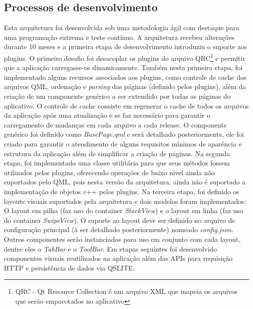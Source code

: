\subsection{Processos de desenvolvimento}
Esta arquitetura foi desenvolvida sob uma metodologia ágil com destaque para uma programação extrema e teste contínuo. A arquitetura recebeu alterações durante 10 meses e a primeira etapa de desenvolvimento introduziu o suporte aos plugins. O primeiro desafio foi desacoplar os plugins do arquivo QRC\footnote{QRC - Qt Resource Collection é um arquivo XML que mapeia os arquivos que serão empacotados no aplicativo} e permitir que a aplicação carregasse-os dinamicamente. Também nesta primeira etapa, foi implementado alguns recursos associados aos plugins, como controle de cache dos arquivos QML, ordenação e \textit{parsing} das páginas (definido pelos plugins), além da criação de um componente genérico a ser extendido por todas as páginas do aplicativo. O controle de cache consiste em regenerar o cache de todos os arquivos da aplicação após uma atualização e se faz necessário para garantir o carregamento de mudanças em cada arquivo a cada release. O componente genérico foi definido como \textit{BasePage.qml} e será detalhado posteriormente, ele foi criado para garantir o atendimento de alguns requisitos mínimos de aparência e estrutura da aplicação além de simplificar a criação de páginas. Na segunda etapa, foi implementado uma classe utilitária para que seus métodos fossem utilizados pelos plugins, oferecendo operações de baixo nível ainda não suportados pelo QML, pois nesta versão da arquitetura, ainda não é suportado a implementação de objetos c++ pelos plugins. Na terceira etapa, foi definido os layouts visuais suportados pela arquitetura e dois modelos foram implementados: O layout em pilha (faz uso do container \textit{StackView}) e o layout em linha (faz uso do container \textit{SwipeView}). O suporte ao layout deve ser definido no arquivo de configuração principal (à ser detalhado posteriormente) nomeado \textit{config.json}. Outros componentes serão instanciados para uso em conjunto com cada layout, dentre eles o \textit{TabBar} e o \textit{ToolBar}. Em etapas seguintes foi desenvolvido componentes visuais reutilizados na aplicação além das APIs para requisição HTTP e persistência de dados via QSLITE.


